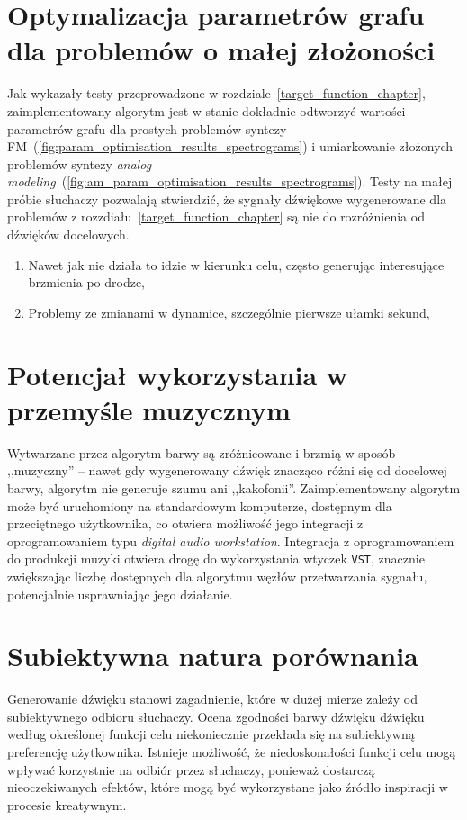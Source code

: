 \section{Optymalizacja parametrów grafu dla problemów o małej złożoności}

Jak wykazały testy przeprowadzone w rozdziale~\ref{target_function_chapter},
zaimplementowany algorytm jest w stanie dokładnie odtworzyć wartości
parametrów grafu dla prostych problemów syntezy
FM~(\ref{fig:param_optimisation_results_spectrograms})
i umiarkowanie złożonych problemów syntezy
\textit{analog modeling}~(\ref{fig:am_param_optimisation_results_spectrograms}).
Testy na małej próbie słuchaczy pozwalają stwierdzić,
że sygnały dźwiękowe wygenerowane dla problemów z rozzdiału~\ref{target_function_chapter}
są nie do rozróżnienia od dźwięków docelowych.

\begin{enumerate}
  \item Nawet jak nie działa to idzie w kierunku celu, często generując interesujące brzmienia po drodze,
  \item Problemy ze zmianami w dynamice, szczególnie pierwsze ułamki sekund,
\end{enumerate}


\section{Potencjał wykorzystania w przemyśle muzycznym}

Wytwarzane przez algorytm barwy są zróżnicowane i brzmią
w sposób ,,muzyczny'' -- nawet gdy wygenerowany dźwięk
znacząco różni się od docelowej barwy, algorytm nie generuje
szumu ani ,,kakofonii''. 
Zaimplementowany algorytm może być uruchomiony na standardowym komputerze,
dostępnym dla przeciętnego użytkownika, co otwiera możliwość jego integracji
z oprogramowaniem typu \textit{digital audio workstation}. Integracja
z oprogramowaniem do produkcji muzyki otwiera drogę do wykorzystania
wtyczek \texttt{VST}, znacznie zwiększając liczbę dostępnych
dla algorytmu węzłów przetwarzania sygnału, potencjalnie usprawniając
jego działanie.


\section{Subiektywna natura porównania}

Generowanie dźwięku stanowi zagadnienie,
które w dużej mierze zależy od subiektywnego odbioru słuchaczy.
Ocena zgodności barwy dźwięku dźwięku według określonej funkcji celu
niekoniecznie przekłada się na subiektywną preferencję użytkownika.
Istnieje możliwość, że niedoskonałości funkcji celu mogą wpływać korzystnie na 
odbiór przez słuchaczy, ponieważ dostarczą nieoczekiwanych efektów, 
które mogą być wykorzystane jako źródło inspiracji w procesie kreatywnym.

